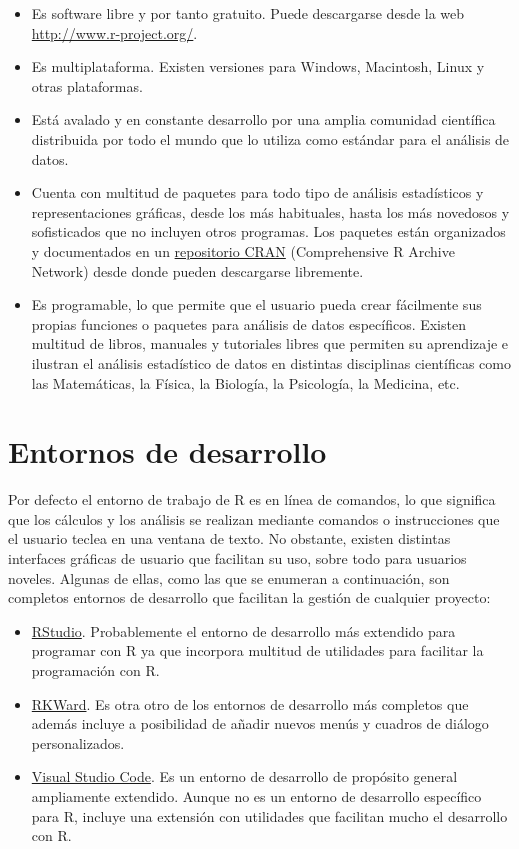 \documentclass[
]{book}
\providecommand{\tightlist}{%
  \setlength{\itemsep}{0pt}\setlength{\parskip}{0pt}}
\begin{document}
\begin{itemize}
\tightlist
\item
  Es software libre y por tanto gratuito. Puede descargarse desde la web \url{http://www.r-project.org/}.
\item
  Es multiplataforma. Existen versiones para Windows, Macintosh, Linux y otras plataformas.
\item
  Está avalado y en constante desarrollo por una amplia comunidad científica distribuida por todo el mundo que lo utiliza como estándar para el análisis de datos.
\item
  Cuenta con multitud de paquetes para todo tipo de análisis estadísticos y representaciones gráficas, desde los más
  habituales, hasta los más novedosos y sofisticados que no incluyen otros programas. Los paquetes están organizados y
  documentados en un \href{https://cran.r-project.org/}{repositorio CRAN} (Comprehensive R Archive Network) desde donde pueden descargarse libremente.
\item
  Es programable, lo que permite que el usuario pueda crear fácilmente sus propias funciones o paquetes para
  análisis de datos específicos.
  Existen multitud de libros, manuales y tutoriales libres que permiten su aprendizaje e ilustran el análisis
  estadístico de datos en distintas disciplinas científicas como las Matemáticas, la Física, la Biología, la Psicología, la Medicina, etc.
\end{itemize}

\hypertarget{entornos-de-desarrollo}{%
\section{Entornos de desarrollo}\label{entornos-de-desarrollo}}

Por defecto el entorno de trabajo de R es en línea de comandos, lo que significa que los cálculos y los análisis se realizan mediante comandos o instrucciones que el usuario teclea en una ventana de texto. No obstante, existen distintas
interfaces gráficas de usuario que facilitan su uso, sobre todo para usuarios noveles. Algunas de ellas, como las que se enumeran a continuación, son completos entornos de desarrollo que facilitan la gestión de cualquier proyecto:

\begin{itemize}
\tightlist
\item
  \href{https://www.rstudio.com/}{RStudio}. Probablemente el entorno de desarrollo más extendido para programar con R ya que incorpora multitud de utilidades para facilitar la programación con R.
\item
  \href{https://rkward.kde.org}{RKWard}. Es otra otro de los entornos de desarrollo más completos que además incluye a posibilidad de añadir nuevos menús y cuadros de diálogo personalizados.
\item
  \href{https://code.visualstudio.com/}{Visual Studio Code}. Es un entorno de desarrollo de propósito general ampliamente extendido. Aunque no es un entorno de desarrollo específico para R, incluye una extensión con utilidades que facilitan mucho el desarrollo con R.
\end{itemize}
\end{document}
